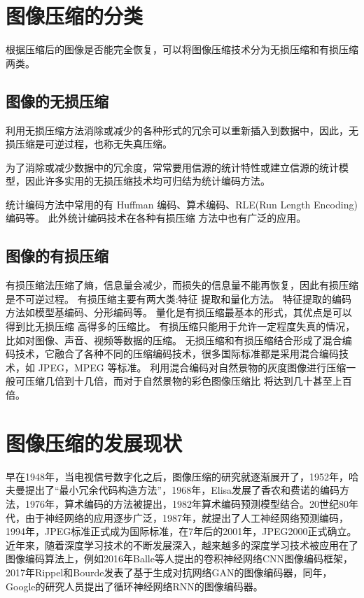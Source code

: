 \section{图像压缩的分类}
根据压缩后的图像是否能完全恢复，可以将图像压缩技术分为无损压缩和有损压缩两类。
\subsection{图像的无损压缩}

利用无损压缩方法消除或减少的各种形式的冗余可以重新插入到数据中，因此，无损压缩是可逆过程，也称无失真压缩。

为了消除或减少数据中的冗余度，常常要用信源的统计特性或建立信源的统计模型，因此许多实用的无损压缩技术均可归结为统计编码方法。

统计编码方法中常用的有 Huffman 编码、算术编码、RLE(Run Length Encoding)编码等。 此外统计编码技术在各种有损压缩 方法中也有广泛的应用。

\subsection{图像的有损压缩}

有损压缩法压缩了熵，信息量会减少，而损失的信息量不能再恢复，因此有损压缩是不可逆过程。 有损压缩主要有两大类:特征 提取和量化方法。 特征提取的编码方法如模型基编码、分形编码等。 量化是有损压缩最基本的形式，其优点是可以得到比无损压缩 高得多的压缩比。 有损压缩只能用于允许一定程度失真的情况，比如对图像、声音、视频等数据的压缩。
无损压缩和有损压缩结合形成了混合编码技术，它融合了各种不同的压缩编码技术，很多国际标准都是采用混合编码技术，如 JPEG，MPEG 等标准。 利用混合编码对自然景物的灰度图像进行压缩一般可压缩几倍到十几倍，而对于自然景物的彩色图像压缩比 将达到几十甚至上百倍。

\section{图像压缩的发展现状}

早在1948年，当电视信号数字化之后，图像压缩的研究就逐渐展开了，1952年，哈夫曼提出了“最小冗余代码构造方法”\cite{最小冗余代码构造方法}，1968年，Elisa发展了香农和费诺的编码方法\cite{elias1955coding}，1976年，算术编码的方法\cite{rissanen1976generalized}被提出，1982年算术编码预测模型结合。20世纪80年代，由于神经网络的应用逐步广泛，1987年，就提出了人工神经网络预测编码，1994年，JPEG\cite{wallace1992jpeg}标准正式成为国际标准，在7年后的2001年，JPEG2000\cite{rabbani2002jpeg2000}正式确立。近年来，随着深度学习技术的不断发展深入，越来越多的深度学习技术被应用在了图像编码算法上，例如2016年Balle等人提出的卷积神经网络CNN图像编码框架\cite{balle2016end}，2017年Rippel和Bourde发表了基于生成对抗网络GAN的图像编码器\cite{rippel2017real}，同年，Google的研究人员提出了循环神经网络RNN的图像编码器\cite{toderici2017full}。
